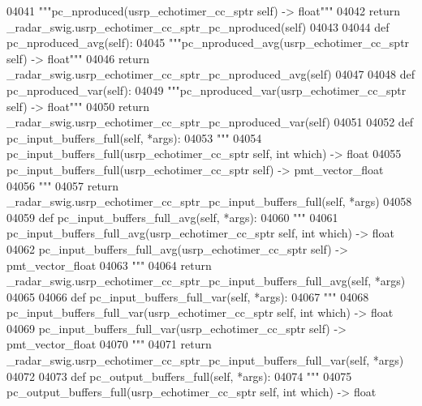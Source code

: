 \begin{DoxyCode}
{{{{{{{{{{{{{{04041         \textcolor{stringliteral}{"""pc\_nproduced(usrp\_echotimer\_cc\_sptr self) -> float"""}
04042         \textcolor{keywordflow}{return} \_radar\_swig.usrp\_echotimer\_cc\_sptr\_pc\_nproduced(self)
04043 
04044     \textcolor{keyword}{def }pc_nproduced_avg(self):
04045         \textcolor{stringliteral}{"""pc\_nproduced\_avg(usrp\_echotimer\_cc\_sptr self) -> float"""}
04046         \textcolor{keywordflow}{return} \_radar\_swig.usrp\_echotimer\_cc\_sptr\_pc\_nproduced\_avg(self)
04047 
04048     \textcolor{keyword}{def }pc_nproduced_var(self):
04049         \textcolor{stringliteral}{"""pc\_nproduced\_var(usrp\_echotimer\_cc\_sptr self) -> float"""}
04050         \textcolor{keywordflow}{return} \_radar\_swig.usrp\_echotimer\_cc\_sptr\_pc\_nproduced\_var(self)
04051 
04052     \textcolor{keyword}{def }pc_input_buffers_full(self, *args):
04053         \textcolor{stringliteral}{"""}
04054 \textcolor{stringliteral}{        pc\_input\_buffers\_full(usrp\_echotimer\_cc\_sptr self, int which) -> float}
04055 \textcolor{stringliteral}{        pc\_input\_buffers\_full(usrp\_echotimer\_cc\_sptr self) -> pmt\_vector\_float}
04056 \textcolor{stringliteral}{        """}
04057         \textcolor{keywordflow}{return} \_radar\_swig.usrp\_echotimer\_cc\_sptr\_pc\_input\_buffers\_full(self, *args)
04058 
04059     \textcolor{keyword}{def }pc_input_buffers_full_avg(self, *args):
04060         \textcolor{stringliteral}{"""}
04061 \textcolor{stringliteral}{        pc\_input\_buffers\_full\_avg(usrp\_echotimer\_cc\_sptr self, int which) -> float}
04062 \textcolor{stringliteral}{        pc\_input\_buffers\_full\_avg(usrp\_echotimer\_cc\_sptr self) -> pmt\_vector\_float}
04063 \textcolor{stringliteral}{        """}
04064         \textcolor{keywordflow}{return} \_radar\_swig.usrp\_echotimer\_cc\_sptr\_pc\_input\_buffers\_full\_avg(self, *args)
04065 
04066     \textcolor{keyword}{def }pc_input_buffers_full_var(self, *args):
04067         \textcolor{stringliteral}{"""}
04068 \textcolor{stringliteral}{        pc\_input\_buffers\_full\_var(usrp\_echotimer\_cc\_sptr self, int which) -> float}
04069 \textcolor{stringliteral}{        pc\_input\_buffers\_full\_var(usrp\_echotimer\_cc\_sptr self) -> pmt\_vector\_float}
04070 \textcolor{stringliteral}{        """}
04071         \textcolor{keywordflow}{return} \_radar\_swig.usrp\_echotimer\_cc\_sptr\_pc\_input\_buffers\_full\_var(self, *args)
04072 
04073     \textcolor{keyword}{def }pc_output_buffers_full(self, *args):
04074         \textcolor{stringliteral}{"""}
04075 \textcolor{stringliteral}{        pc\_output\_buffers\_full(usrp\_echotimer\_cc\_sptr self, int which) -> float}
}}}}}}}}}}}}}}
\end{DoxyCode}
